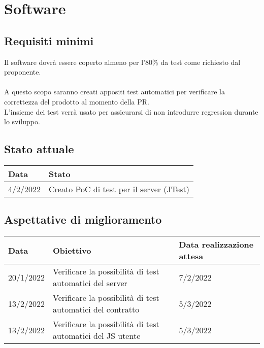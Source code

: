 \documentclass[a4paper, 12pt]{article}
\begin{document}
\section{Software}
\subsection{Requisiti minimi}
Il software dovrà essere coperto almeno per l'80\% da test come richiesto dal proponente.\\\\
A questo scopo saranno creati appositi test automatici per verificare la correttezza del prodotto al momento della PR.\\
L'insieme dei test verrà usato per assicurarsi di non introdurre regression durante lo sviluppo.

\subsection{Stato attuale}
\begin{tabular}{|l|l|}\hline
	Data & Stato \\\hline
	4/2/2022 & Creato PoC di test per il server (JTest)\\\hline
\end{tabular}

\subsection{Aspettative di miglioramento}
\begin{tabular}{|l|l|l|}\hline
	Data & Obiettivo & Data realizzazione attesa \\\hline
	20/1/2022 & Verificare la possibilità di test automatici del server & 7/2/2022\\\hline
	13/2/2022 & Verificare la possibilità di test automatici del contratto & 5/3/2022\\\hline
	13/2/2022 & Verificare la possibilità di test automatici del JS utente & 5/3/2022\\\hline
\end{tabular}
\end{document}
